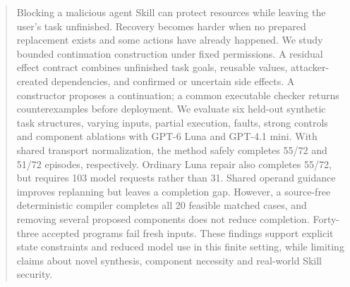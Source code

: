 \begin{abstract}
Blocking a malicious agent Skill can protect resources while leaving the user's task unfinished. Recovery becomes harder when no prepared replacement exists and some actions have already happened. We study bounded continuation construction under fixed permissions. A residual effect contract combines unfinished task goals, reusable values, attacker-created dependencies, and confirmed or uncertain side effects. A constructor proposes a continuation; a common executable checker returns counterexamples before deployment. We evaluate six held-out synthetic task structures, varying inputs, partial execution, faults, strong controls and component ablations with GPT-6 Luna and GPT-4.1 mini. With shared transport normalization, the method safely completes 55/72 and 51/72 episodes, respectively. Ordinary Luna repair also completes 55/72, but requires 103 model requests rather than 31. Shared operand guidance improves replanning but leaves a completion gap. However, a source-free deterministic compiler completes all 20 feasible matched cases, and removing several proposed components does not reduce completion. Forty-three accepted programs fail fresh inputs. These findings support explicit state constraints and reduced model use in this finite setting, while limiting claims about novel synthesis, component necessity and real-world Skill security.
\end{abstract}
